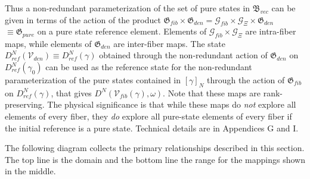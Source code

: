 \documentclass[aps,preprint]{revtex4}%
\begin{document}
Thus a non-redundant parameterization of the set of pure states in
$\mathfrak{B}_{vec}$ can be given in terms of the action of the product
$\mathfrak{G}_{fib}\times\mathfrak{G}_{den}=\mathcal{G}_{fib}\times
\mathcal{G}_{\Xi}\times\mathfrak{G}_{den}$ $\equiv\mathfrak{G}_{pure}$ on a
pure state reference element. Elements of $\mathcal{G}_{fib}\times
\mathcal{G}_{\Xi}$ are intra-fiber maps, while elements of $\mathfrak{G}%
_{den}$ are inter-fiber maps. The state $D_{ref}^{N}\left(  \mathcal{V}%
_{den}\right)  \equiv D_{ref}^{N}\left(  \mathcal{\gamma}\right)  $ obtained
through the non-redundant action of $\mathfrak{G}_{den}$ on $D_{ref}%
^{N}\left(  \gamma_{0}\right)  $ can be used as the reference state for the
non-redundant parameterization of the pure states contained in $\left[
\gamma\right]  _{N}$ through the action of $\mathfrak{G}_{fib}$ on
$D_{ref}^{N}\left(  \mathcal{\gamma}\right)  $, that gives $D^{N}\left(
\mathcal{V}_{fib}\left(  \gamma\right)  ,\mathcal{\omega}\right)  $. Note that
these maps are rank-preserving. The physical significance is that while these
maps do \emph{not} explore all elements of every fiber, they \emph{do} explore
all pure-state elements of every fiber if the initial reference is a pure
state. Technical details are in Appendices G and I.

The following diagram collects the primary relationships described in this
section. The top line is the domain and the bottom line the range for the
mappings shown in the middle.

\end{document}
